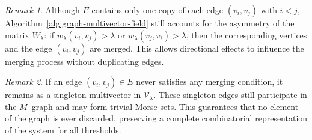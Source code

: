 \documentclass{article}
\theoremstyle{definition}
\theoremstyle{plain}
\theoremstyle{remark}
\newtheorem{remark}{Remark}
\newcommand{\1}{\mathbbm{1}}  %
\begin{document}
\begin{remark}
\label{rem:directionality-final}
Although $E$ contains only one copy of each edge $(v_i,v_j)$ with $i<j$,
 Algorithm~\ref{alg:graph-multivector-field} still accounts for the asymmetry of the matrix $W_\lambda$:
if $w_\lambda(v_i,v_j)>\lambda$ or $w_\lambda(v_j,v_i)>\lambda$, then
the corresponding vertices and the edge $(v_i,v_j)$ are merged.  
This allows directional effects to influence the merging process without
duplicating edges.
\end{remark}

 

























\begin{remark}
\label{rem:singleton_edges}
If an edge $(v_i,v_j)\in E$ never satisfies any merging condition,
it remains as a singleton multivector in $\mathcal V_\lambda$.
These singleton edges still participate in the $M$--graph and may
form trivial Morse sets.  This guarantees that no element of the
graph is ever discarded, preserving a complete combinatorial
representation of the system for all thresholds.
\end{remark}

\medskip










 
\end{document}
